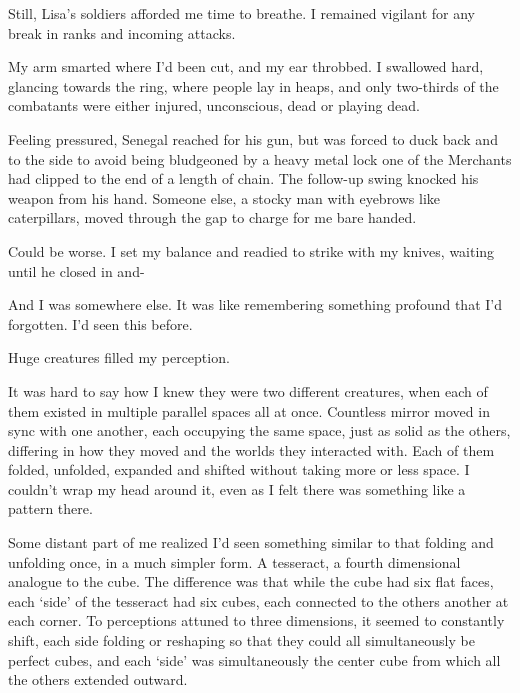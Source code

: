 Still, Lisa's soldiers afforded me time to breathe.  I remained vigilant for any break in ranks and incoming attacks.



My arm smarted where I'd been cut, and my ear throbbed.  I swallowed hard, glancing towards the ring, where people lay in heaps, and only two-thirds of the combatants were either injured, unconscious, dead or playing dead.



Feeling pressured, Senegal reached for his gun, but was forced to duck back and to the side to avoid being bludgeoned by a heavy metal lock one of the Merchants had clipped to the end of a length of chain.  The follow-up swing knocked his weapon from his hand.  Someone else, a stocky man with eyebrows like caterpillars, moved through the gap to charge for me bare handed.



Could be worse.  I set my balance and readied to strike with my knives, waiting until he closed in and-



And I was somewhere else.  It was like remembering something profound that I'd forgotten.  I'd seen this before.



Huge creatures filled my perception.



It was hard to say how I knew they were two different creatures, when each of them existed in multiple parallel spaces all at once.  Countless mirror moved in sync with one another, each occupying the same space, just as solid as the others, differing in how they moved and the worlds they interacted with.  Each of them folded, unfolded, expanded and shifted without taking more or less space.  I couldn't wrap my head around it, even as I felt there was something like a pattern there.



Some distant part of me realized I'd seen something similar to that folding and unfolding once, in a much simpler form.  A tesseract, a fourth dimensional analogue to the cube.  The difference was that while the cube had six flat faces, each `side' of the tesseract had six cubes, each connected to the others another at each corner.  To perceptions attuned to three dimensions, it seemed to constantly shift, each side folding or reshaping so that they could all simultaneously be perfect cubes, and each `side' was simultaneously the center cube from which all the others extended outward.



